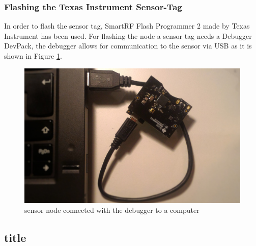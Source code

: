 \subsubsection{Flashing the Texas Instrument Sensor-Tag} 
\label{sec:flash}
In order to flash the sensor tag, SmartRF Flash Programmer 2 made by Texas Instrument has been used. For flashing the node a sensor tag needs a Debugger DevPack, the debugger allows for communication to the sensor via USB as it is shown in Figure \ref{fig:debug}.  
\begin{figure}[!h]
	\begin{center}
		\includegraphics[width=0.8\linewidth]{debugger}
		\caption{sensor node connected with the debugger to a computer}
		\label{fig:debug}
	\end{center}
	
\end{figure} 

\subsection{title}